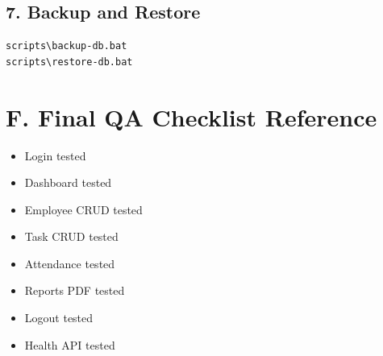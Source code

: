 \subsection*{7. Backup and Restore}
\begin{verbatim}
scripts\backup-db.bat
scripts\restore-db.bat
\end{verbatim}

\section{F. Final QA Checklist Reference}
\begin{itemize}[leftmargin=1.3cm]
\item Login tested
\item Dashboard tested
\item Employee CRUD tested
\item Task CRUD tested
\item Attendance tested
\item Reports PDF tested
\item Logout tested
\item Health API tested
\end{itemize}

